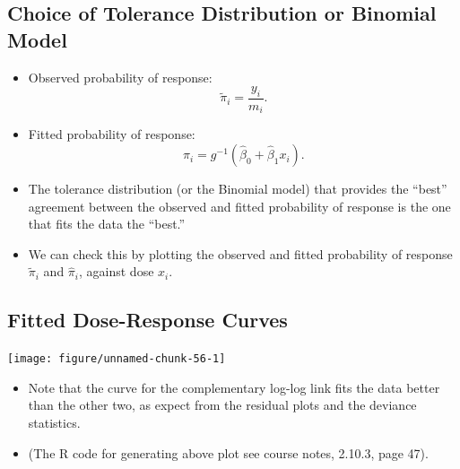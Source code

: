 \documentclass{article}\usepackage[]{graphicx}\usepackage[svgnames]{xcolor}
\newenvironment{knitrout}{}{} %
\begin{document}
\subsection*{Choice of Tolerance Distribution or Binomial Model}
\begin{itemize}
      \item Observed probability of response:
            \[ \tilde{\pi}_i=\frac{y_i}{m_i}. \]
      \item Fitted probability of response:
            \[ \hat{\pi}_i=g^{-1}(\hat{\beta}_0+\hat{\beta}_1x_i). \]
      \item The tolerance distribution (or the Binomial model) that provides the ``best''
            agreement between the observed and fitted probability of response is the one that fits the data the ``best.''
      \item We can check this by plotting the observed and fitted probability of response $ \tilde{\pi}_i $ and $ \hat{\pi}_i $,
            against dose $ x_i $.
\end{itemize}
\subsection*{Fitted Dose-Response Curves}
\begin{knitrout}
\color{fgcolor}

{\centering \texttt{[image: figure/unnamed-chunk-56-1]} 

}


\end{knitrout}
\begin{itemize}
      \item Note that the curve for the complementary log-log link fits the data better than
            the other two, as expect from the residual plots and the deviance statistics.
      \item (The R code for generating above plot see course notes, 2.10.3, page 47).
\end{itemize}
\end{document}
